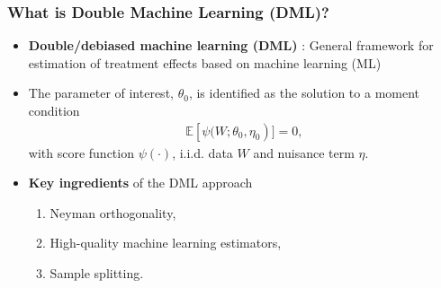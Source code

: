 \mode*


\begin{frame}
\frametitle{What is Double Machine Learning (DML)?}
\begin{itemize}
\item \textbf{Double/debiased machine learning (DML)} \parencite{Chernozhukov2018}:  General framework for estimation of treatment effects based on machine learning (ML)
\item The parameter of interest, $\theta_0$, is identified as the solution to a moment condition 
\begin{align*}
\mathbb{E}\left[\psi(W;\theta_0, \eta_0 \right)] = 0,
\end{align*}
with score function $\psi(\cdot)$, i.i.d. data $W$ and nuisance term $\eta$.
\item \textbf{Key ingredients} of the DML approach
\begin{enumerate}
\item Neyman orthogonality,
\item High-quality machine learning estimators,
\item Sample splitting.
\end{enumerate}
%
\end{itemize}
\end{frame}

